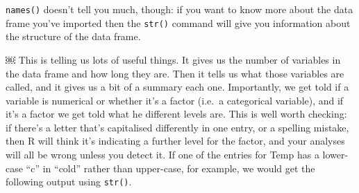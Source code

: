 \documentclass[
]{book}
\newenvironment{Shaded}{\begin{snugshade}}{\end{snugshade}}
\newcommand{\DecValTok}[1]{\textcolor[rgb]{0.00,0.00,0.81}{#1}}
\newcommand{\ErrorTok}[1]{\textcolor[rgb]{0.64,0.00,0.00}{\textbf{#1}}}
\newcommand{\FloatTok}[1]{\textcolor[rgb]{0.00,0.00,0.81}{#1}}
\newcommand{\KeywordTok}[1]{\textcolor[rgb]{0.13,0.29,0.53}{\textbf{#1}}}
\newcommand{\NormalTok}[1]{#1}
\newcommand{\OperatorTok}[1]{\textcolor[rgb]{0.81,0.36,0.00}{\textbf{#1}}}
\newcommand{\StringTok}[1]{\textcolor[rgb]{0.31,0.60,0.02}{#1}}
\begin{document}
\texttt{names()} doesn't tell you much, though: if you want to know more about the data frame you've imported then the \texttt{str()} command will give you information about the structure of the data frame.

\begin{Shaded}
\end{Shaded}

￼
This is telling us lots of useful things. It gives us the number of variables in the data frame and how long they are. Then it tells us what those variables are called, and it gives us a bit of a summary each one. Importantly, we get told if a variable is numerical or whether it's a factor (i.e.~a categorical variable), and if it's a factor we get told what he different levels are. This is well worth checking: if there's a letter that's capitalised differently in one entry, or a spelling mistake, then R will think it's indicating a further level for the factor, and your analyses will all be wrong unless you detect it. If one of the entries for Temp has a lower-case ``c'' in ``cold'' rather than upper-case, for example, we would get the following output using \texttt{str()}.
\end{document}

